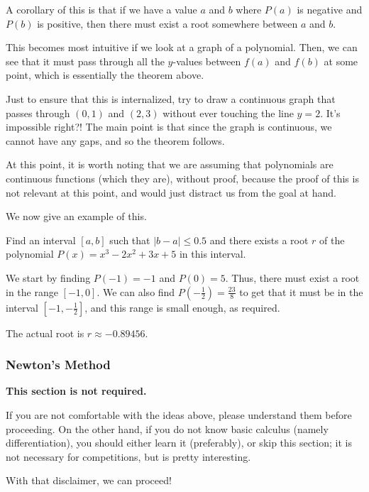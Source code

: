 \documentclass[11pt]{scrartcl}
\begin{document}
A corollary of this is that if we have a value $a$ and $b$ where $P(a)$ is negative and $P(b)$ is positive, then there must exist a root somewhere between $a$ and $b$.

This becomes most intuitive if we look at a graph of a polynomial. Then, we can see that it must pass through all the $y$-values between $f(a)$ and $f(b)$ at some point, which is essentially the theorem above.

Just to ensure that this is internalized, try to draw a continuous graph that passes through $(0, 1)$ and $(2, 3)$ without ever touching the line $y = 2$. It's impossible right?! The main point is that since the graph is continuous, we cannot have any gaps, and so the theorem follows.

At this point, it is worth noting that we are assuming that polynomials are continuous functions (which they are), without proof, because the proof of this is not relevant at this point, and would just distract us from the goal at hand.

We now give an example of this.

\begin{example*}
Find an interval $[a, b]$ such that $|b-a| \le 0.5$ and there exists a root $r$ of the polynomial $P(x) = x^3-2x^2+3x+5$ in this interval.
\end{example*}

We start by finding $P(-1) = -1$ and $P(0) = 5$. Thus, there must exist a root in the range $[-1, 0]$. We can also find $P\left(-\tfrac{1}{2}\right) = \tfrac{23}{8}$ to get that it must be in the interval $[-1, -\tfrac{1}{2}]$, and this range is small enough, as required.

\begin{remark*}
The actual root is $r \approx -0.89456$.
\end{remark*}

\subsubsection{Newton's Method}

\textbf{This section is not required.}

If you are not comfortable with the ideas above, please understand them before proceeding. On the other hand, if you do not know basic calculus (namely differentiation), you should either learn it (preferably), or skip this section; it is not necessary for competitions, but is pretty interesting.

With that disclaimer, we can proceed!
\end{document}
